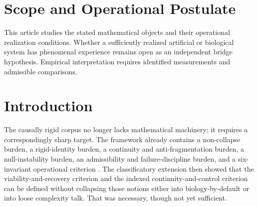 \documentclass[11pt,a4paper]{article}
\theoremstyle{definition}
\begin{document}
\begin{abstract}
The strongest claim is conditional and explicit: under the stated bridge axioms, under the upstream burdens already closed by the corpus, and under positive irreducibility and intervention-separation margins, a system may instantiate a framework-internal indexed structural class whose best explanation is no longer mere self-monitoring, memory, reporting, or generic integration. The term ``seven-coordinate indexed certificate'' names that class and its conditions. Human comparison and phenomenal interpretation require independent bridge premises and admissible evidence. What is made explicit here is the formal architecture: the ontology, the gate, the functional, the rival baselines, the falsification logic, the runtime pathway, the artifact family, and the strongest defensible claim class the current corpus can bear without collapsing its own layer discipline.
The constructive analysis includes the connected-fibre obstruction, five native selective lesions on the writable tower, an exact public-information return tie and a separately accessible-signal comparison. Their information and intervention restrictions remain explicit; For a new candidate, complete upstream membership and broad-rival closure remain separate obligations.
An infinite-dimensional upstream witness with causally exchangeable Hilbert ports has exactly zero matched valuation asymmetry, giving strict separation of the complete declared classes. This strictness witness establishes upstream separation; the separate native construction supplies nonemptiness under its declared causal grammar.
\end{abstract}

\section*{Scope and Operational Postulate}
This article studies the stated mathematical objects and their operational
realization conditions. Whether a sufficiently realized artificial or biological
system has phenomenal experience remains open as an independent bridge
hypothesis. Empirical interpretation requires identified measurements and
admissible comparisons.

\section{Introduction}
The causally rigid corpus no longer lacks mathematical machinery; it requires a correspondingly sharp target. The framework already contains a non-collapse burden, a rigid-identity burden, a continuity and anti-fragmentation burden, a null-instability burden, an admissibility and failure-discipline burden, and a six-invariant operational criterion \cite{core,paper1,paper2,paper3,paper4,paper5}. The classificatory extension then showed that the viability-and-recovery criterion and the indexed continuity-and-control criterion can be defined without collapsing those notions either into biology-by-default or into loose complexity talk. That was necessary, though not yet sufficient.
\end{document}
